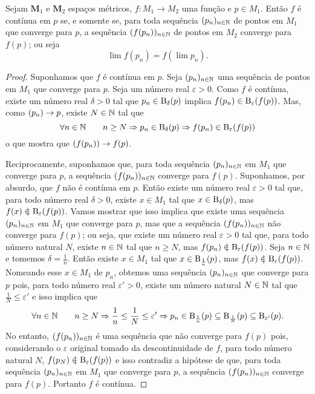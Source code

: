 \begin{proposition}
Sejam $\bm M_1$ e $\bm M_2$ espaços métricos, $f: M_1 \to M_2$ uma função e $p \in M_1$. Então $f$ é contínua em $p$ se, e somente se, para toda sequência $(p_n)_{n \in \mathbb{N}}$ de pontos em $M_1$ que converge para $p$, a sequência $(f(p_n))_{n \in \mathbb{N}}$ de pontos em $M_2$ converge para $f(p)$; ou seja
	\begin{equation*}
	\lim f(p_n) = f(\lim p_n).
	\end{equation*}
\end{proposition}
\begin{proof}
	Suponhamos que $f$ é contínua em $p$. Seja $(p_n)_{n \in \mathbb{N}}$ uma sequência de pontos em $M_1$ que converge para $p$. Seja um número real $\varepsilon > 0$. Como $f$ é contínua, existe um número real $\delta > 0$ tal que $p_n \in \mathrm{B}_\delta(p)$ implica $f(p_n) \in \mathrm{B}_\varepsilon(f(p))$. Mas, como $(p_n) \rightarrow p$, existe $N \in \mathbb{N}$ tal que
	\begin{equation*}
	\forall n \in \mathbb{N} \qquad n \geq N \Rightarrow p_n \in \mathrm{B}_\delta(p) \Rightarrow f(p_n) \in \mathrm{B}_\varepsilon(f(p))
	\end{equation*}
o que mostra que $(f(p_n)) \rightarrow f(p)$.
	
	Reciprocamente, suponhamos que, para toda sequência $(p_n)_{n \in \mathbb{N}}$ em $M_1$ que converge para $p$, a sequência $(f(p_n))_{n \in \mathbb{N}}$ converge para $f(p)$. Suponhamos, por absurdo, que $f$ não é contínua em $p$. Então existe um número real $\varepsilon > 0$ tal que, para todo número real $\delta > 0$, existe $x \in M_1$ tal que $x \in \mathrm{B}_\delta(p)$, mas $f(x) \notin \bola_\varepsilon(f(p))$. Vamos mostrar que isso implica que existe uma sequência $(p_n)_{n \in \mathbb{N}}$ em $M_1$ que converge para $p$, mas que a sequência $(f(p_n))_{n \in \mathbb{N}}$ não converge para $f(p)$; ou seja, que existe um número real $\varepsilon > 0$ tal que, para todo número natural $N$, existe $n \in \mathbb{N}$ tal que $n \geq N$, mas $f(p_n) \notin \bola_\varepsilon(f(p))$. Seja $n \in \mathbb{N}$ e tomemos $\delta = \frac{1}{n}$. Então existe $x \in M_1$ tal que $x \in \mathrm{B}_\frac{1}{n}(p)$, mas $f(x) \notin \bola_\varepsilon(f(p))$. Nomeando esse $x \in M_1$ de $p_n$, obtemos uma sequência $(p_n)_{n \in \mathbb{N}}$ que converge para $p$ pois, para todo número real $\varepsilon' > 0$, existe um número natural $N \in \mathbb{N}$ tal que $\frac{1}{N} \leq \varepsilon'$ e isso implica que
\begin{equation*}
	\forall n \in \mathbb{N} \qquad n \geq N \Rightarrow \frac{1}{n} \leq \frac{1}{N} \leq \varepsilon' \Rightarrow p_n \in \mathrm{B}_\frac{1}{n}(p) \subseteq \mathrm{B}_\frac{1}{N}(p) \subseteq \mathrm{B}_{\varepsilon'}(p).
	\end{equation*}
	No entanto, $(f(p_n))_{n \in \mathbb{N}}$ é uma sequência que não converge para $f(p)$ pois, considerando o $\varepsilon$ original tomado da descontinuidade de $f$, para todo número natural $N$, $f(p_N) \notin \bola_\varepsilon(f(p))$ e isso contradiz a hipótese de que, para toda sequência $(p_n)_{n \in \mathbb{N}}$ em $M_1$ que converge para $p$, a sequência $(f(p_n))_{n \in \mathbb{N}}$ converge para $f(p)$. Portanto $f$ é contínua.	
\end{proof}

